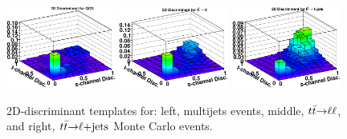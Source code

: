 \begin{figure}[!h!tbp]
\includegraphics[width=0.32\textwidth]
{figures/performance/2D-Discriminant_qcd}
\includegraphics[width=0.32\textwidth]
{figures/performance/2D-Discriminant_dilepton}
\includegraphics[width=0.32\textwidth]
{figures/performance/2D-Discriminant_lepjets}
\vspace{-0.1in}
\caption[wjjqcdtt]{2D-discriminant templates for: left,
multijets events, middle, $\mbox{${\mbox{$t\bar{t}$}}{\rightarrow}\ell\ell$}$, and right, $\mbox{${\mbox{$t\bar{t}$}}{\rightarrow}\ell$+jets}$ Monte
Carlo events.}
\label{qcdtt}
\end{figure}

